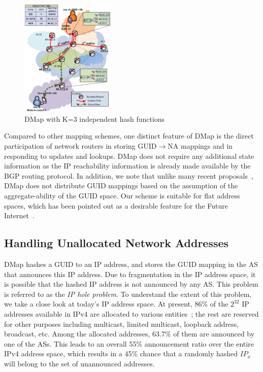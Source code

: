 \begin{center}
        \begin{figure}[t]
            \centering
            \includegraphics[width=0.4\textwidth]{figures/designV2.eps}
            \caption{DMap with K=3 independent hash functions}
            \label{fig:design}
            \vspace{-0.2in}
        \end{figure}
    \end{center}

\vspace{-0.2in}
Compared to other mapping schemes, one distinct feature of DMap is the direct participation of network routers in storing GUID$\rightarrow$NA mappings and in responding to updates and lookups. DMap does not require any additional state information as the IP reachability information is already made available by the BGP routing protocol.  In addition, we note that unlike many recent proposals~\cite{farinacci-alt,jen,jakab,mathy}, DMap does not distribute GUID mappings based on the assumption of the aggregate-ability of
the GUID space.  Our scheme is suitable for flat address spaces, which has been pointed out as a desirable feature for the Future Internet~\cite{andersen,moskowitz}.

\subsection{Handling Unallocated Network Addresses}
\label{subsec:ip_hole}

DMap hashes a GUID to an IP address, and stores the GUID mapping in the AS that announces this IP address.  Due to fragmentation in the IP address space, it is possible that the hashed IP address is not announced by any AS. This problem is referred to as the \emph{IP hole problem}. To understand the extent of this problem, we take a close look at today's IP address space. At present, 86\% of the $2^{32}$ IP addresses available in IPv4 are allocated to various entities~\cite{dix-ie}; the rest are reserved for other purposes including multicast, limited multicast, loopback address, broadcast, etc. Among the allocated addresses, 63.7\% of them are announced by one of the ASs. This leads to an overall 55\% announcement ratio over the entire IPv4 address space, which results in a 45\% chance that a randomly hashed $IP_x$ will belong to the set of unannounced addresses.

